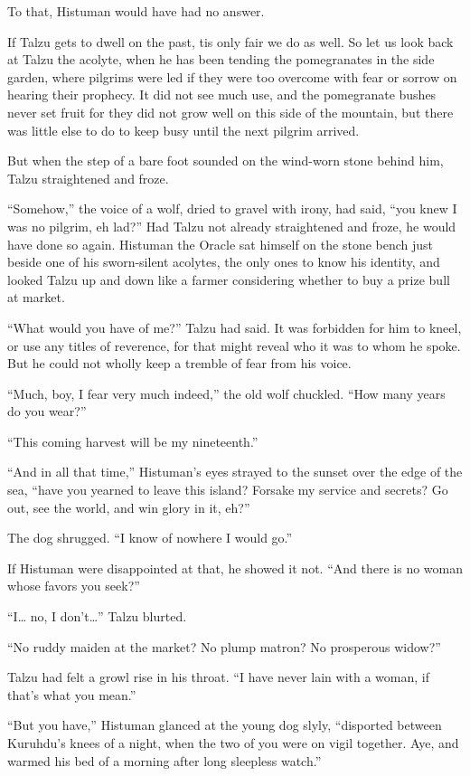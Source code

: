 To that, Histuman would have had no answer.

\secdiv

If Talzu gets to dwell on the past, tis only fair we do as well. So let us look back at Talzu the acolyte, when he has been tending the pomegranates in the side garden, where pilgrims were led if they were too overcome with fear or sorrow on hearing their prophecy. It did not see much use, and the pomegranate bushes never set fruit for they did not grow well on this side of the mountain, but there was little else to do to keep busy until the next pilgrim arrived.

But when the step of a bare foot sounded on the wind-worn stone behind him, Talzu straightened and froze.

``Somehow,'' the voice of a wolf, dried to gravel with irony, had said, ``you knew I was no pilgrim, eh lad?'' Had Talzu not already straightened and froze, he would have done so again. Histuman the Oracle sat himself on the stone bench just beside one of his sworn-silent acolytes, the only ones to know his identity, and looked Talzu up and down like a farmer considering whether to buy a prize bull at market.

``What would you have of me?'' Talzu had said. It was forbidden for him to kneel, or use any titles of reverence, for that might reveal who it was to whom he spoke. But he could not wholly keep a tremble of fear from his voice.

``Much, boy, I fear very much indeed,'' the old wolf chuckled. ``How many years do you wear?''

``This coming harvest will be my nineteenth.''

``And in all that time,'' Histuman's eyes strayed to the sunset over the edge of the sea, ``have you yearned to leave this island? Forsake my service and secrets? Go out, see the world, and win glory in it, eh?''

The dog shrugged. ``I know of nowhere I would go.''

If Histuman were disappointed at that, he showed it not. ``And there is no woman whose favors you seek?''

``I\ldots{} no, I don't\ldots'' Talzu blurted.

``No ruddy maiden at the market? No plump matron? No prosperous widow?''

Talzu had felt a growl rise in his throat. ``I have never lain with a woman, if that's what you mean.''

``But you have,'' Histuman glanced at the young dog slyly, ``disported between Kuruhdu's knees of a night, when the two of you were on vigil together. Aye, and warmed his bed of a morning after long sleepless watch.''

